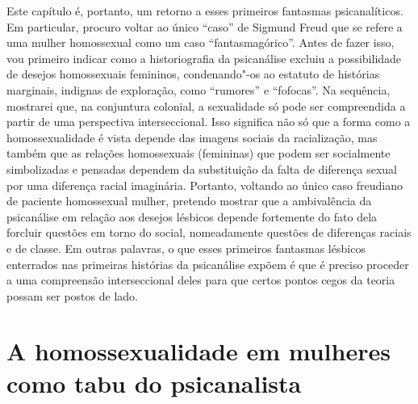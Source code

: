 Este capítulo é, portanto, um retorno a esses primeiros fantasmas
psicanalíticos. Em particular, procuro voltar ao único ``caso'' de
Sigmund Freud que se refere a uma mulher homossexual como um caso
``fantasmagórico''. Antes de fazer isso, vou primeiro indicar como a
historiografia da psicanálise excluiu a possibilidade de desejos
homossexuais femininos, condenando"-os ao estatuto de histórias
marginais, indignas de exploração, como ``rumores'' e ``fofocas''. Na
sequência, mostrarei que, na conjuntura colonial, a sexualidade só pode
ser compreendida a partir de uma perspectiva interseccional. Isso
significa não só que a forma como a homossexualidade é vista depende das
imagens sociais da racialização, mas também que as relações homossexuais
(femininas) que podem ser socialmente simbolizadas e pensadas dependem
da substituição da falta de diferença sexual por uma diferença racial
imaginária. Portanto, voltando ao único caso freudiano de paciente
homossexual mulher, pretendo mostrar que a ambivalência da psicanálise
em relação aos desejos lésbicos depende fortemente do fato dela forcluir
questões em torno do social, nomeadamente questões de diferenças raciais
e de classe. Em outras palavras, o que esses primeiros fantasmas
lésbicos enterrados nas primeiras histórias da psicanálise expõem é que
é preciso proceder a uma compreensão interseccional deles para que
certos pontos cegos da teoria possam ser postos de lado.

\section{A homossexualidade em mulheres como tabu do psicanalista}

